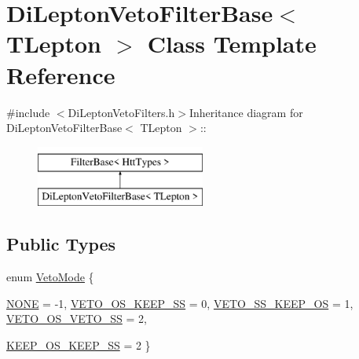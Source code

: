 \hypertarget{classDiLeptonVetoFilterBase}{
\section{DiLeptonVetoFilterBase$<$ TLepton $>$ Class Template Reference}
\label{classDiLeptonVetoFilterBase}
}


{\ttfamily \#include $<$DiLeptonVetoFilters.h$>$}Inheritance diagram for DiLeptonVetoFilterBase$<$ TLepton $>$::\begin{figure}[H]
\begin{center}
\leavevmode
\includegraphics[height=2cm]{classDiLeptonVetoFilterBase}
\end{center}
\end{figure}
\subsection*{Public Types}
\begin{DoxyCompactItemize}
\item 
enum \hyperlink{classDiLeptonVetoFilterBase_a61fbc3c58cdc545f10826f677cecd0fe}{VetoMode} \{ \par
\hyperlink{classDiLeptonVetoFilterBase_a61fbc3c58cdc545f10826f677cecd0fea44f1085c72384a3ee8c1b2e04bd17a0e}{NONE} =  -\/1, 
\hyperlink{classDiLeptonVetoFilterBase_a61fbc3c58cdc545f10826f677cecd0fea6799754dd1eed9286031a5f3334a4330}{VETO\_\-OS\_\-KEEP\_\-SS} =  0, 
\hyperlink{classDiLeptonVetoFilterBase_a61fbc3c58cdc545f10826f677cecd0feafb324814186b1cb3d0ade9c0c77c816a}{VETO\_\-SS\_\-KEEP\_\-OS} =  1, 
\hyperlink{classDiLeptonVetoFilterBase_a61fbc3c58cdc545f10826f677cecd0feaeda61ce7fe92ad3daf4ebe4c7354403a}{VETO\_\-OS\_\-VETO\_\-SS} =  2, 
\par
\hyperlink{classDiLeptonVetoFilterBase_a61fbc3c58cdc545f10826f677cecd0fea93bf1585b32e974917ebd99858e14fbe}{KEEP\_\-OS\_\-KEEP\_\-SS} =  2
 \}
\end{DoxyCompactItemize}

